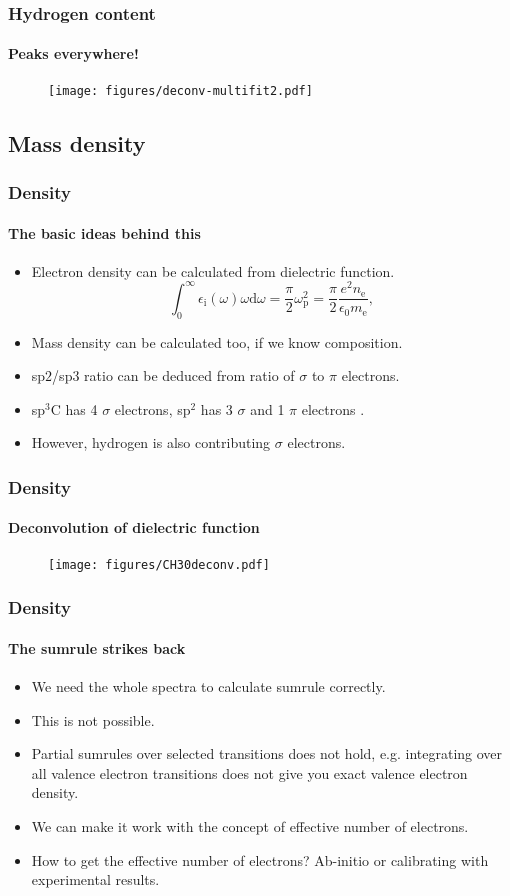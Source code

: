 \documentclass{beamer}
\begin{document}
\begin{frame}
    \frametitle{Hydrogen content}
   \framesubtitle{Peaks everywhere!}

	\begin{figure}
	\texttt{[image: figures/deconv-multifit2.pdf]}
	\end{figure}

\end{frame}

\subsection{Mass density}
\begin{frame}
   \frametitle{Density}
   \framesubtitle{The basic ideas behind this}

   \begin{itemize}
	\item Electron density can be calculated from dielectric function.
	$$
	\int_0^\infty \epsilon_\mathrm{i} (\omega) \omega \mathrm{d} \omega = \frac{\pi}{2} \omega_\mathrm{p}	^2 = \frac{\pi}{2} \frac{e^2 n_\mathrm{e}}{ \epsilon_0 m_\mathrm{e}} \mathrm{,}
	$$
   \item Mass density can be calculated too, if we know composition.
   \item sp$2$/sp$3$ ratio can be deduced from ratio of $\sigma$ to $\pi$ electrons.
   \item sp$^3$C has 4 $\sigma$ electrons, sp$^2$ has 3 $\sigma$ and 1 $\pi$ electrons .
   \item However, hydrogen is also contributing $\sigma$ electrons.
   \end{itemize}

\end{frame}

\begin{frame}
   \frametitle{Density}
   \framesubtitle{Deconvolution of dielectric function}

	\begin{figure}
	\texttt{[image: figures/CH30deconv.pdf]}
	\end{figure}

\end{frame}


\begin{frame}
   \frametitle{Density}
   \framesubtitle{The sumrule strikes back}

   \begin{itemize}
	\item We need the whole spectra to calculate sumrule correctly.
   \item This is not possible.
   \item Partial sumrules over selected transitions does not hold, e.g. integrating over all valence electron transitions does not give you exact valence electron density.
   \item We can make it work with the concept of effective number of electrons.
   \item How to get the effective number of electrons? Ab-initio or calibrating with experimental results.
   \end{itemize}
\end{frame}
\end{document}
